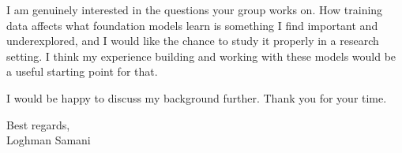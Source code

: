 \documentclass[a4paper,11pt]{article}
\begin{document}
I am genuinely interested in the questions your group works on. How training data affects what foundation models learn is something I find important and underexplored, and I would like the chance to study it properly in a research setting. I think my experience building and working with these models would be a useful starting point for that.

I would be happy to discuss my background further. Thank you for your time.

\vspace{6mm}

Best regards, \\
Loghman Samani
\end{document}
